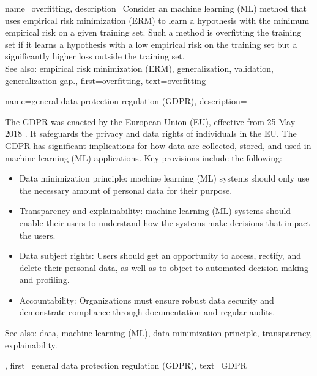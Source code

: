 {
{name={overfitting},
	description={Consider an 
		machine learning (ML) method that uses empirical risk minimization (ERM) to learn a hypothesis with the minimum empirical risk on 
		a given training set. Such a method is overfitting the training set if it learns 
		a hypothesis with a low empirical risk on the training set but a significantly higher loss outside the training set.
					\\ 
		See also: empirical risk minimization (ERM), generalization, validation, generalization gap.},
	first={overfitting},
	text={overfitting}
}

{name={general data protection regulation (GDPR)},
	description={The GDPR
			was enacted by the European Union (EU), effective from 25 May 2018 \cite{GDPR2016}. 
			It safeguards the privacy and data rights of individuals in the EU. 
			The GDPR has significant implications for how data are collected, stored, and used in machine learning (ML)  
			applications. Key provisions include the following:
			\begin{itemize}
				\item Data minimization principle: machine learning (ML) systems should only use the necessary amount of personal 
				data for their purpose.
				\item Transparency and explainability: machine learning (ML) systems should enable their users to 
				understand how the systems make decisions that impact the users.
				\item Data subject rights: Users should get an opportunity to access, rectify, and delete their personal data, as well as to object to automated decision-making and profiling.
				\item Accountability: Organizations must ensure robust data security and demonstrate 
				compliance through documentation and regular audits.
			\end{itemize}
		See also: data, machine learning (ML), data minimization principle, transparency, explainability.}, 
	first={general data protection regulation (GDPR)},
	text={GDPR}
}
	
}
